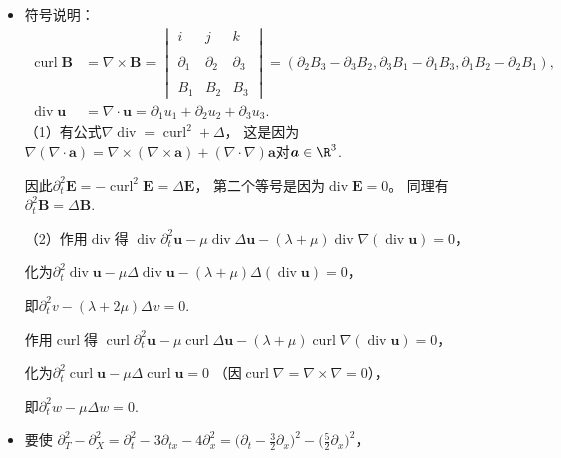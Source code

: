 \begin{itemize}
\item[2.]符号说明：
\begin{align*}
\operatorname{curl}\boldsymbol{B}&=\nabla\times\boldsymbol{B}=
\begin{vmatrix}
    i&j&k\\ \\
    \partial_1&\partial_2&\partial_3\\ \\
    B_1&B_2&B_3
\end{vmatrix}
=(\partial_2B_3-\partial_3B_2,\partial_3B_1-\partial_1B_3,\partial_1B_2-\partial_2B_1),\\
\operatorname{div}\boldsymbol{u}&=\nabla\cdot\boldsymbol{u}
=\partial_1u_1+\partial_2u_2+\partial_3u_3.
\end{align*}
（1）有公式$\nabla\operatorname{div}=\operatorname{curl}^2+\Delta$，
这是因为$\nabla(\nabla\cdot\boldsymbol{a})=\nabla\times(\nabla\times\boldsymbol{a})
+(\nabla\cdot\nabla)\boldsymbol{a}$对$\boldsymbol{a}\in\R^3$.

因此$\partial_t^2\boldsymbol{E}=-\operatorname{curl}^2\boldsymbol{E}=\Delta\boldsymbol{E}$，
第二个等号是因为$\operatorname{div}\boldsymbol{E}=0$。
同理有$\partial_t^2\boldsymbol{B}=\Delta\boldsymbol{B}$.

（2）作用$\operatorname{div}$得
$\operatorname{div}\partial_t^2\boldsymbol{u}-\mu\operatorname{div}\Delta\boldsymbol{u}
-(\lambda+\mu)\operatorname{div}\nabla(\operatorname{div}\boldsymbol{u})=0$，

化为$\partial_t^2\operatorname{div}\boldsymbol{u}
-\mu\Delta\operatorname{div}\boldsymbol{u}
-(\lambda+\mu)\Delta(\operatorname{div}\boldsymbol{u})=0$，

即$\partial_t^2v-(\lambda+2\mu)\Delta v=0$.

作用$\operatorname{curl}$得
$\operatorname{curl}\partial_t^2\boldsymbol{u}
-\mu\operatorname{curl}\Delta\boldsymbol{u}
-(\lambda+\mu)\operatorname{curl}\nabla(\operatorname{div}\boldsymbol{u})=0$，

化为$\partial_t^2\operatorname{curl}\boldsymbol{u}-\mu\Delta\operatorname{curl}\boldsymbol{u}=0$ 
（因$\operatorname{curl}\nabla=\nabla\times\nabla=0$），

即$\partial_t^2w-\mu\Delta w=0$.

\item[3.] 要使
$\partial_T^2-\partial_X^2
=\partial_t^2-3\partial_{tx}-4\partial_x^2
=\big(\partial_t-\frac{3}{2}\partial_x\big)^2-\big(\tfrac{5}{2}\partial_x\big)^2$，


\end{itemize}
